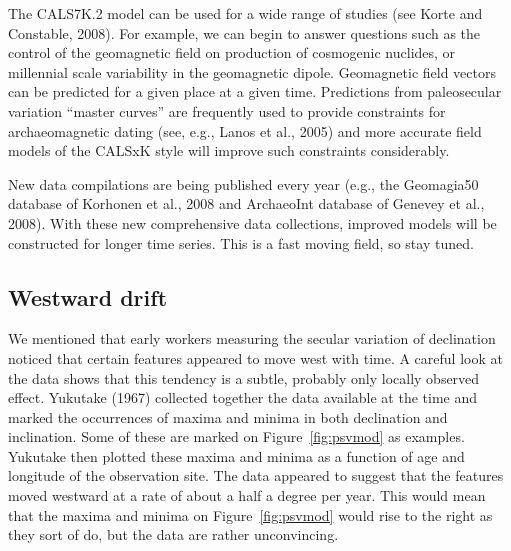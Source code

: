 The CALS7K.2 model can be used  for a wide range of studies (see 
Korte and Constable, 2008). \nocite{korte08}  For example, we can begin to answer questions  such as the control of the geomagnetic field on production of cosmogenic nuclides, or  millennial scale variability in the geomagnetic dipole.   Geomagnetic field vectors can be predicted for a given place at a given time. Predictions from paleosecular variation ``master curves'' are frequently   used to provide constraints for archaeomagnetic dating (see, e.g., 
Lanos et al., 2005) and more accurate field models of the CALSxK style will improve such constraints considerably.  \nocite{lanos05}  

New data compilations are being published every year (e.g., the
 Geomagia50 database of  
 Korhonen et al., 2008 and   
 ArchaeoInt database of
  Genevey et al., 2008).   \nocite{korhonen08,genevey08}   With these new comprehensive data collections, improved  models will be constructed for longer time series.  This is a fast moving field, so stay tuned.  


\subsection {Westward drift}

We  mentioned that early workers measuring the secular variation of declination noticed that certain features appeared to move west with time.  A careful look at the data shows that  this tendency is a subtle, probably only locally observed effect.  
Yukutake (1967)\nocite{yukutake67} collected together the data available at the time and marked the occurrences of maxima and minima in both declination and inclination.   Some of these are marked on Figure~\ref{fig:psvmod} as examples.  Yukutake then plotted these maxima and minima as a function of age and longitude of the observation site.  The data appeared to suggest that the features moved westward at a rate of about a half a degree per year.  This would mean that the maxima and minima on Figure~\ref{fig:psvmod} would rise to the right as they sort of do, but the data are rather unconvincing.  


